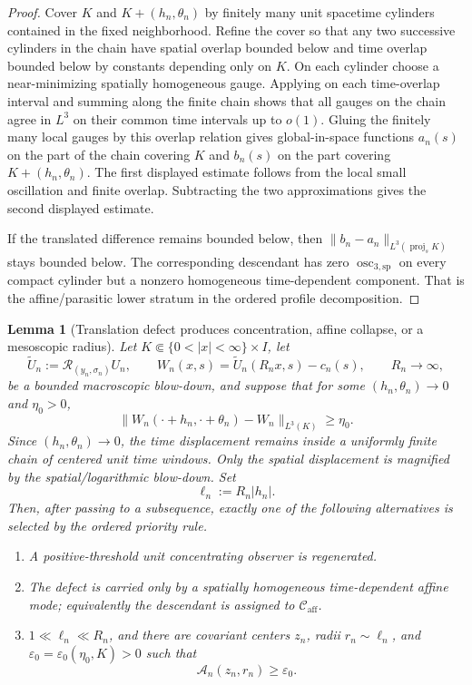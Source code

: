 \documentclass[11pt]{amsart}
\numberwithin{equation}{section}
\theoremstyle{plain}
\newtheorem{lemma}[lemma]{Lemma}
\theoremstyle{definition}
\theoremstyle{remark}
\newcommand{\calR}{\mathcal R}
\newcommand{\Caff}{\mathcal C_{\mathrm{aff}}}
\newcommand{\oscsp}{\operatorname{osc}_{3,\mathrm{sp}}}
\begin{document}
\begin{proof}
Cover \(K\) and \(K+(h_n,\theta_n)\) by finitely many unit spacetime cylinders
contained in the fixed neighborhood.  Refine the cover so that any two
successive cylinders in the chain have spatial overlap bounded below and time
overlap bounded below by constants depending only on \(K\).  On each cylinder
choose a near-minimizing spatially homogeneous gauge.  Applying
 on each time-overlap interval and
summing along the finite chain shows that all gauges on the chain agree in
\(L^3\) on their common time intervals up to \(o(1)\).  Gluing the finitely many
local gauges by this overlap relation gives global-in-space functions
\(a_n(s)\) on the part of the chain covering \(K\) and \(b_n(s)\) on the part
covering \(K+(h_n,\theta_n)\).  The first displayed estimate follows from the
local small oscillation and finite overlap.  Subtracting the two approximations
gives the second displayed estimate.

If the translated difference remains bounded below, then
\(\|b_n-a_n\|_{L^3(\operatorname{proj}_sK)}\) stays bounded below.  The
corresponding descendant has zero \(\oscsp\) on every compact cylinder but a
nonzero homogeneous time-dependent component.
That is the affine/parasitic lower stratum in the ordered profile
decomposition.
\end{proof}

\begin{lemma}[Translation defect produces concentration, affine collapse, or a mesoscopic radius]
\label{lem:translation-defect-to-bad-radius}
Let \(K\Subset\{0<|x|<\infty\}\times I\), let
\[
   \widetilde U_n:=\calR_{(y_n,\sigma_n)}U_n,\qquad
   W_n(x,s)=\widetilde U_n(R_nx,s)-c_n(s),
   \qquad R_n\to\infty,
\]
be a bounded macroscopic blow-down, and suppose that for some
\((h_n,\theta_n)\to0\) and \(\eta_0>0\),
\[
   \|W_n(\cdot+h_n,\cdot+\theta_n)-W_n\|_{L^3(K)}\ge\eta_0 .
\]
Since \((h_n,\theta_n)\to0\), the time displacement remains inside a uniformly
finite chain of centered unit time windows.  Only the spatial displacement is
magnified by the spatial/logarithmic blow-down.  Set
\[
   \ell_n:=R_n|h_n|.
\]
Then, after passing to a subsequence, exactly one of the following alternatives
is selected by the ordered priority rule.
\begin{enumerate}[label=\textup{(\roman*)}]
   \item A positive-threshold unit concentrating observer is regenerated.
   \item The defect is carried only by a spatially homogeneous time-dependent
   affine mode; equivalently the descendant is assigned to \(\Caff\).
   \item \(1\ll\ell_n\ll R_n\), and there are covariant centers \(z_n\), radii
   \(r_n\sim\ell_n\), and \(\varepsilon_0=\varepsilon_0(\eta_0,K)>0\) such that
   \[
      \mathcal A_n(z_n,r_n)\ge\varepsilon_0 .
   \]
\end{enumerate}
\end{lemma}
\end{document}
